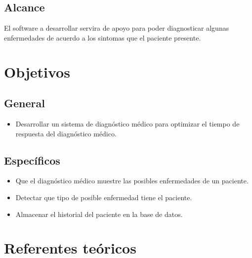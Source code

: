 \documentclass[preprint,12pt]{elsarticle}
\begin{document}
	\subsection{\textbf{ Alcance }}
El software a desarrollar servira de apoyo para poder diagnosticar algunas enfermedades de acuerdo a los sintomas que el paciente presente.

\section{Objetivos}
		\subsection{\textbf{ General }}
	 \begin{itemize}
		\item Desarrollar un sistema de diagnóstico médico para optimizar el tiempo  de respuesta del diagnóstico médico.
	 \end{itemize}
		\subsection{\textbf{Específicos }}
\begin{itemize}
	\item Que el diagnóstico médico muestre las posibles enfermedades de un paciente.
	\item Detectar que tipo de posible enfermedad tiene el paciente. 
	\item Almacenar el historial del paciente en la base de datos. 
	\end{itemize}

	\section{Referentes teóricos}
\end{document}
